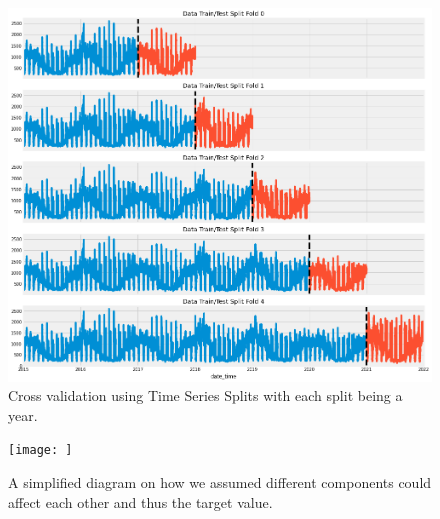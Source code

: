 \begin{figure}[h]
    \centering
    \includegraphics[width=15cm]{report/images/ts-cross-validation.png}
    \caption{Cross validation using Time Series Splits with each split being a year.}
    \label{fig:ts-cross-validation}
\end{figure}

\begin{figure}[h] 
\centering
\texttt{[image: ]}
\caption{A simplified diagram on how we assumed different components could affect each other and thus the target value.}
\label{fig:components} 
\end{figure}